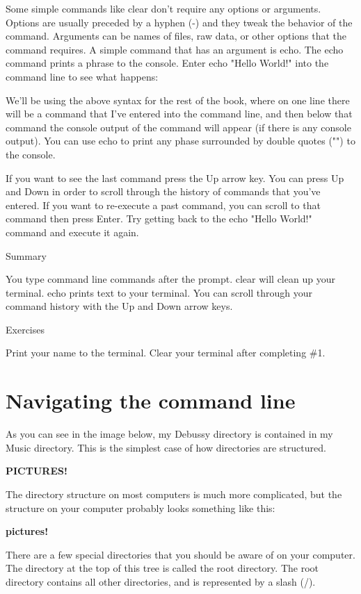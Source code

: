 Some simple commands like clear don’t require any options or arguments. Options are usually preceded by a hyphen (-) and they tweak the behavior of the command. Arguments can be names of files, raw data, or other options that the command requires. A simple command that has an argument is echo. The echo command prints a phrase to the console. Enter echo "Hello World!" into the command line to see what happens:

We’ll be using the above syntax for the rest of the book, where on one line there will be a command that I’ve entered into the command line, and then below that command the console output of the command will appear (if there is any console output). You can use echo to print any phase surrounded by double quotes ("") to the console.

If you want to see the last command press the Up arrow key. You can press Up and Down in order to scroll through the history of commands that you’ve entered. If you want to re-execute a past command, you can scroll to that command then press Enter. Try getting back to the echo "Hello World!" command and execute it again.

Summary

You type command line commands after the prompt.
clear will clean up your terminal.
echo prints text to your terminal.
You can scroll through your command history with the Up and Down arrow keys.

Exercises

Print your name to the terminal.
Clear your terminal after completing \#1.

\section{Navigating the command line}
As you can see in the image below, my Debussy directory is contained in my Music directory. This is the simplest case of how directories are structured.

\textbf{PICTURES!}

The directory structure on most computers is much more complicated, but the structure on your computer probably looks something like this:

\textbf{pictures!}

There are a few special directories that you should be aware of on your computer. The directory at the top of this tree is called the root directory. The root directory contains all other directories, and is represented by a slash (/).

